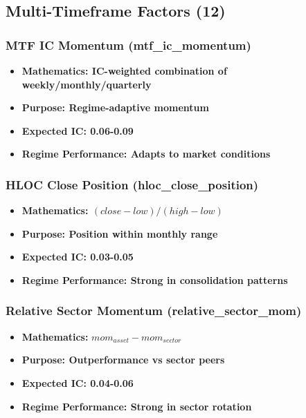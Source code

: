 \documentclass[11pt,letterpaper,openany]{book}
\begin{document}
\subsection{Multi-Timeframe Factors (12)}

\subsubsection{MTF IC Momentum (mtf\_ic\_momentum)}
\begin{itemize}
    \item \textbf{Mathematics: IC-weighted combination of weekly/monthly/quarterly}
    \item \textbf{Purpose: Regime-adaptive momentum}
    \item \textbf{Expected IC: 0.06-0.09}
    \item \textbf{Regime Performance: Adapts to market conditions}
\end{itemize}

\subsubsection{HLOC Close Position (hloc\_close\_position)}
\begin{itemize}
    \item \textbf{Mathematics: $(close - low) / (high - low)$}
    \item \textbf{Purpose: Position within monthly range}
    \item \textbf{Expected IC: 0.03-0.05}
    \item \textbf{Regime Performance: Strong in consolidation patterns}
\end{itemize}

\subsubsection{Relative Sector Momentum (relative\_sector\_mom)}
\begin{itemize}
    \item \textbf{Mathematics:} $mom_{asset} - mom_{sector}$
    \item \textbf{Purpose: Outperformance vs sector peers}
    \item \textbf{Expected IC: 0.04-0.06}
    \item \textbf{Regime Performance: Strong in sector rotation}
\end{itemize}

% 
\end{document}
